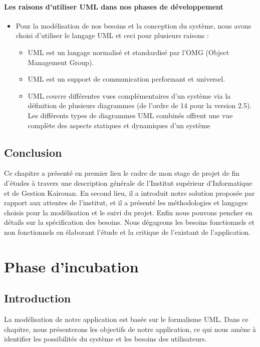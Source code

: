 \documentclass[12 pt ]{report}
\begin{document}
\subsubsection{	Les raisons d’utiliser UML dans nos phases de développement }
\begin{itemize}[font=\color{black} \Large, label=]

\item Pour la modélisation de nos besoins et la conception du système, nous avons choisi d’utiliser le langage UML et ceci pour plusieurs raisons :
\begin{itemize}[font=\color{black} \Large, label=]

	\item UML est un langage normalisé et standardisé par l’OMG (Object Management Group).
	\item UML est un support de communication performant et universel.
	\item UML couvre différentes vues complémentaires d’un système via la définition de plusieurs diagrammes (de l’ordre de 14 pour la version 2.5). Les différents types de diagrammes UML combinés offrent une vue complète des aspects statiques et dynamiques d’un système
\end{itemize}
\end{itemize}
\section*{Conclusion}  


Ce chapitre a présenté en premier lieu le cadre de mon stage de projet de fin d’études à travers une description générale de l’Institut supérieur d’Informatique et de Gestion Kairouan. En second lieu, il a introduit notre solution proposée par rapport aux attentes de l’institut, et il a présenté les méthodologies et langages choisis pour la modélisation et le suivi du projet. Enfin nous pouvons pencher en détails sur la spécification des besoins. Nous dégageons les besoins fonctionnels et non fonctionnels en élaborant l’étude et la critique de l’existant de l’application. 
\clearpage
\chapter{Phase d’incubation}
\section*{Introduction}  
La modélisation de notre application est basée sur le formalisme UML. Dans ce chapitre, nous présenterons les objectifs de notre application, ce qui nous amène à identifier les possibilités du système et les besoins des utilisateurs.
\end{document}
